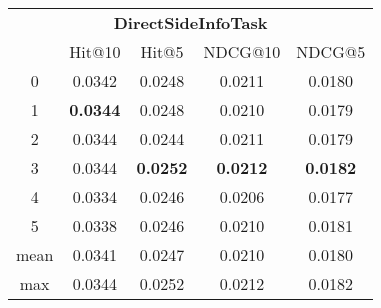 \documentclass{article}
\begin{document}
 

\begin{tabular}{c|cccc}

\multicolumn{5}{c}{\textbf{DirectSideInfoTask}} \\
\noalign{\smallskip}
\noalign{\smallskip}
\toprule
\multicolumn{1}{c}{Template ID} & \multicolumn{1}{|c}{Hit@10} & \multicolumn{1}{c}{Hit@5} & \multicolumn{1}{c}{NDCG@10} & \multicolumn{1}{c}{NDCG@5} \\
\midrule
0 & 0.0342 & 0.0248 & 0.0211 & 0.0180 \\
1 & \textbf{0.0344} & 0.0248 & 0.0210 & 0.0179 \\
2 & 0.0344 & 0.0244 & 0.0211 & 0.0179 \\
3 & 0.0344 & \textbf{0.0252} & \textbf{0.0212} & \textbf{0.0182} \\
4 & 0.0334 & 0.0246 & 0.0206 & 0.0177 \\
5 & 0.0338 & 0.0246 & 0.0210 & 0.0181 \\
\midrule
mean & 0.0341 & 0.0247 & 0.0210 & 0.0180 \\
max & 0.0344 & 0.0252 & 0.0212 & 0.0182 \\
\bottomrule

\end{tabular}
\end{document}
